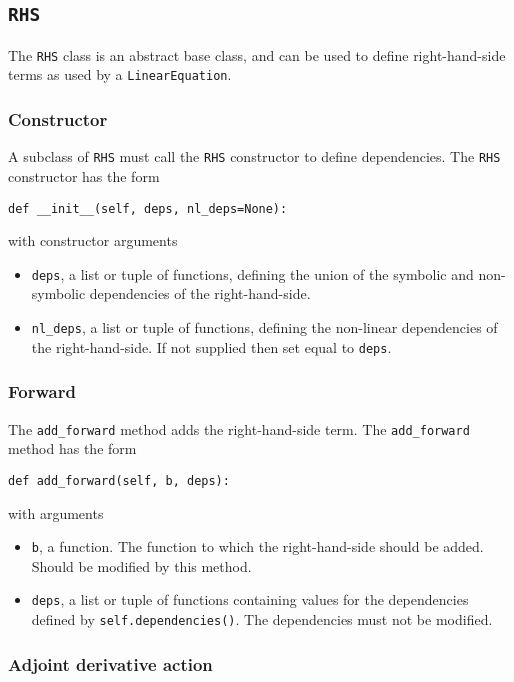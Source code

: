 \documentclass[11pt]{article}
\begin{document}
\subsection{\texttt{RHS}}

The \texttt{RHS} class is an abstract base class, and can be used to define
right-hand-side terms as used by a \texttt{LinearEquation}.

\subsubsection{Constructor}

A subclass of \texttt{RHS} must call the \texttt{RHS} constructor to define
dependencies. The \texttt{RHS} constructor has the form
\begin{lstlisting}
def __init__(self, deps, nl_deps=None):
\end{lstlisting}
with constructor arguments
\begin{itemize}
  \item \texttt{deps}, a list or tuple of functions, defining the union of the
    symbolic and non-symbolic dependencies of the right-hand-side.
  \item \texttt{nl\_deps}, a list or tuple of functions, defining the
    non-linear dependencies of the right-hand-side. If not supplied then set
    equal to \texttt{deps}.
\end{itemize}

\subsubsection{Forward}

The \texttt{add\_forward} method adds the right-hand-side term. The
\texttt{add\_forward} method has the form
\begin{lstlisting}
def add_forward(self, b, deps):
\end{lstlisting}
with arguments
\begin{itemize}
  \item \texttt{b}, a function. The function to which the right-hand-side
    should be added. Should be modified by this method.
  \item \texttt{deps}, a list or tuple of functions containing values for the
    dependencies defined by \texttt{self.dependencies()}. The dependencies must
    not be modified.
\end{itemize}

\subsubsection{Adjoint derivative action}
\end{document}
